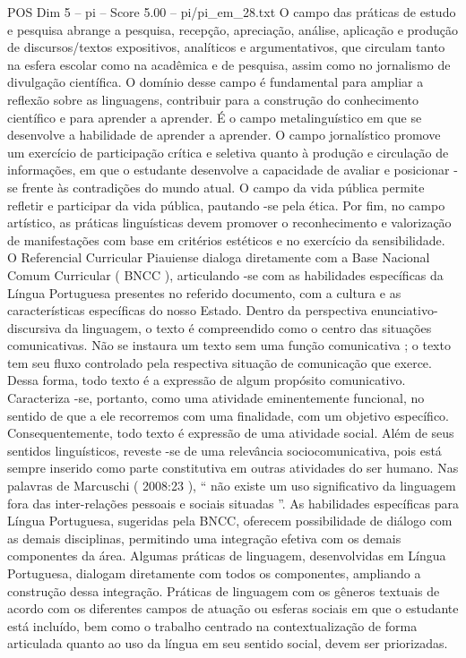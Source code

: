 \begin{textsample}{POS Dim 5 – pi – Score 5.00 – pi/pi\_em\_28.txt}
O campo das práticas de estudo e pesquisa abrange a pesquisa, recepção, apreciação, análise, aplicação e produção de discursos/textos expositivos, analíticos e argumentativos, que circulam tanto na esfera escolar como na acadêmica e de pesquisa, assim como no jornalismo de divulgação científica.
O domínio desse campo é fundamental para ampliar a reflexão sobre as linguagens, contribuir para a construção do conhecimento científico e para aprender a aprender.
É o campo metalinguístico em que se desenvolve a habilidade de aprender a aprender.
O campo jornalístico promove um exercício de participação crítica e seletiva quanto à produção e circulação de informações, em que o estudante desenvolve a capacidade de avaliar e posicionar -se frente às contradições do mundo atual.
O campo da vida pública permite refletir e participar da vida pública, pautando -se pela ética.
Por fim, no campo artístico, as práticas linguísticas devem promover o reconhecimento e valorização de manifestações com base em critérios estéticos e no exercício da sensibilidade.
O Referencial Curricular Piauiense dialoga diretamente com a Base Nacional Comum Curricular ( BNCC ), articulando -se com as habilidades específicas da Língua Portuguesa presentes no referido documento, com a cultura e as características específicas do nosso Estado.
Dentro da perspectiva enunciativo-discursiva da linguagem, o texto é compreendido como o centro das situações comunicativas.
Não se instaura um texto sem uma função comunicativa ; o texto tem seu fluxo controlado pela respectiva situação de comunicação que exerce.
Dessa forma, todo texto é a expressão de algum propósito comunicativo.
Caracteriza -se, portanto, como uma atividade eminentemente funcional, no sentido de que a ele recorremos com uma finalidade, com um objetivo específico.
Consequentemente, todo texto é expressão de uma atividade social.
Além de seus sentidos linguísticos, reveste -se de uma relevância sociocomunicativa, pois está sempre inserido como parte constitutiva em outras atividades do ser humano.
Nas palavras de Marcuschi ( 2008:23 ), “ não existe um uso significativo da linguagem fora das inter-relações pessoais e sociais situadas ”.
As habilidades específicas para Língua Portuguesa, sugeridas pela BNCC, oferecem possibilidade de diálogo com as demais disciplinas, permitindo uma integração efetiva com os demais componentes da área.
Algumas práticas de linguagem, desenvolvidas em Língua Portuguesa, dialogam diretamente com todos os componentes, ampliando a construção dessa integração.
Práticas de linguagem com os gêneros textuais de acordo com os diferentes campos de atuação ou esferas sociais em que o estudante está incluído, bem como o trabalho centrado na contextualização de forma articulada quanto ao uso da língua em seu sentido social, devem ser priorizadas.

\end{textsample}
